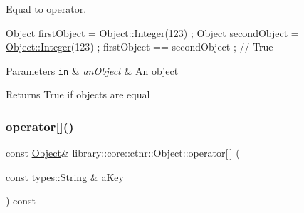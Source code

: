 Equal to operator. 


\begin{DoxyCode}
\hyperlink{classlibrary_1_1core_1_1ctnr_1_1Object_a51bb72dec3a1b2738e0ad92b977b8d8d}{Object} firstObject = \hyperlink{classlibrary_1_1core_1_1ctnr_1_1Object_a6746a69f0507b2c7ad8ebdf3d873b083}{Object::Integer}(123) ;
\hyperlink{classlibrary_1_1core_1_1ctnr_1_1Object_a51bb72dec3a1b2738e0ad92b977b8d8d}{Object} secondObject = \hyperlink{classlibrary_1_1core_1_1ctnr_1_1Object_a6746a69f0507b2c7ad8ebdf3d873b083}{Object::Integer}(123) ;
firstObject == secondObject ; \textcolor{comment}{// True}
\end{DoxyCode}



\begin{DoxyParams}[1]{Parameters}
\mbox{\tt in}  & {\em an\+Object} & An object \\
\hline
\end{DoxyParams}
\begin{DoxyReturn}{Returns}
True if objects are equal 
\end{DoxyReturn}
\mbox{\label{classlibrary_1_1core_1_1ctnr_1_1Object_ad5b78e31dbe7d2cfddb14240b573862b}} 
\subsubsection{\texorpdfstring{operator[]()}{operator[]()}\hspace{0.1cm}{\footnotesize\ttfamily [1/4]}}
{\footnotesize\ttfamily const \hyperlink{classlibrary_1_1core_1_1ctnr_1_1Object}{Object}\& library\+::core\+::ctnr\+::\+Object\+::operator\mbox{[}$\,$\mbox{]} (\begin{DoxyParamCaption}\item[{const \hyperlink{classlibrary_1_1core_1_1types_1_1String}{types\+::\+String} \&}]{a\+Key }\end{DoxyParamCaption}) const}

\mbox{\label{classlibrary_1_1core_1_1ctnr_1_1Object_a4f246b6d17dab0ebb1341fdb887064ad}} 
